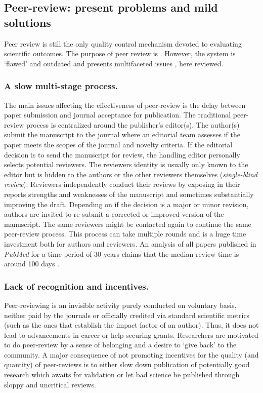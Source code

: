 \documentclass[runningheads]{llncs}
\begin{document}
\subsection{Peer-review: present problems and mild solutions}
Peer review is still the only quality control mechanism devoted to evaluating scientific outcomes. The purpose of peer review is \cite{Gropp-PeerRevStress}. However, the system is `ﬂawed' and outdated \cite{Smith2006} and presents multifaceted issues \cite{Walker2015-trends}, here reviewed.
\subsubsection{A slow multi-stage process.} The main issues affecting the effectiveness of peer-review is the delay between paper submission and journal acceptance for publication. The traditional peer-review process is centralized around the publisher's editor(s). The author(s) submit the manuscript to the journal where an editorial team assesses if the paper meets the scopes of the journal and novelty criteria. If the editorial decision is to send the manuscript for review, the handling editor personally selects potential reviewers. The reviewers identity is usually only known to the editor but is hidden to the authors or the other reviewers themselves (\emph{single-blind review}). Reviewers independently conduct their reviews by exposing in their reports strengths and weaknesses of the manuscript and sometimes substantially improving the draft. Depending on if the decision is a major or minor revision, authors are invited to re-submit a corrected or improved version of the manuscript. The same reviewers might be contacted again to continue the same peer-review process. This process can take multiple rounds and is a huge time investment both for authors and reviewers. An analysis of all papers published in \emph{PubMed} for a time period of 30 years claims that the median review time is around 100 days \cite{Kendall-peerrev}.
\subsubsection{Lack of recognition and incentives.} Peer-reviewing is an invisible activity purely conducted on voluntary basis, neither paid by the journals or officially credited via standard scientific metrics (such as the ones that establish the impact factor of an author). Thus, it does not lead to advancements in career or help securing grants. Researchers are motivated to do peer-review by a sense of belonging and a desire to `give back' to the community. A major consequence of not promoting incentives for the quality (and quantity) of peer-reviews is to either slow down publication of potentially good research which awaits for validation \cite{HauserIncent} or let bad science be published through sloppy and uncritical reviews.
\end{document}

